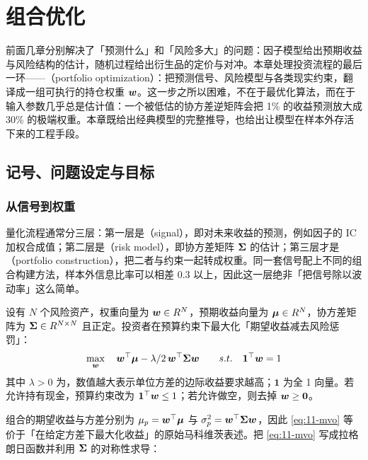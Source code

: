 \chapter{组合优化}

前面几章分别解决了「预测什么」和「风险多大」的问题：因子模型给出预期收益与风险结构的估计，随机过程给出衍生品的定价与对冲。本章处理投资流程的最后一环——（portfolio optimization）：把预测信号、风险模型与各类现实约束，翻译成一组可执行的持仓权重 $\bm{w}$。这一步之所以困难，不在于最优化算法，而在于输入参数几乎总是估计值：一个被低估的协方差逆矩阵会把 1\% 的收益预测放大成 30\% 的极端权重。本章既给出经典模型的完整推导，也给出让模型在样本外存活下来的工程手段。

\section{记号、问题设定与目标}

\subsection{从信号到权重}

量化流程通常分三层：第一层是（signal），即对未来收益的预测，例如因子的 IC 加权合成值；第二层是（risk model），即协方差矩阵 $\bm{\Sigma}$ 的估计；第三层才是（portfolio construction），把二者与约束一起转成权重。同一套信号配上不同的组合构建方法，样本外信息比率可以相差 0.3 以上，因此这一层绝非「把信号除以波动率」这么简单。

\begin{definition}[均值-方差组合问题]\label{def:11-mvo}
设有 $N$ 个风险资产，权重向量为 $\bm{w} \in R^{N}$，预期收益向量为 $\bm{\mu} \in R^{N}$，协方差矩阵为 $\bm{\Sigma} \in R^{N \times N}$ 且正定。投资者在预算约束下最大化「期望收益减去风险惩罚」：
\begin{equation}\label{eq:11-mvo}
  \max_{\bm{w}} \quad \bm{w}^{\top}\bm{\mu} - \lambda/2\,\bm{w}^{\top}\bm{\Sigma}\bm{w}
  \qquad s.t. \quad \mathbf{1}^{\top}\bm{w} = 1
\end{equation}
其中 $\lambda > 0$ 为，数值越大表示单位方差的边际收益要求越高；$\mathbf{1}$ 为全 1 向量。若允许持有现金，预算约束改为 $\mathbf{1}^{\top}\bm{w} \le 1$；若允许做空，则去掉 $\bm{w} \ge \mathbf{0}$。
\end{definition}

组合的期望收益与方差分别为 $\mu_p = \bm{w}^{\top}\bm{\mu}$ 与 $\sigma_p^2 = \bm{w}^{\top}\bm{\Sigma}\bm{w}$，因此 \cref{eq:11-mvo} 等价于「在给定方差下最大化收益」的原始马科维茨表述。把 \cref{eq:11-mvo} 写成拉格朗日函数并利用 $\bm{\Sigma}$ 的对称性求导：

